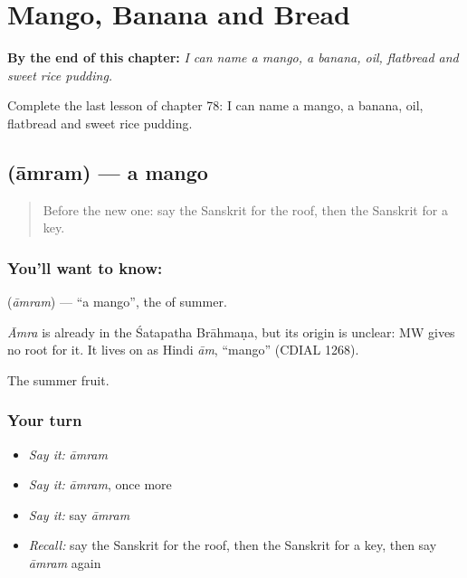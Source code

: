 
\chapter{Mango, Banana and Bread}
\label{ch:sa-mango-banana-bread}

\begin{chapteropening}
\textbf{By the end of this chapter:} \emph{I can name a mango, a banana, oil, flatbread and sweet rice pudding.}

Complete the last lesson of chapter 78: I can name a mango, a banana, oil, flatbread and sweet rice pudding.
\end{chapteropening}

\section[\texorpdfstring{\sk{आम्रम्} (āmram)}{आम्रम् (āmram)}]{ (āmram) — a mango}

\label{lesson:SA-C78-mango}



\begin{quote}
Before the new one: say the Sanskrit for the roof, then the Sanskrit for a key.
\end{quote}

\subsection*{You'll want to know: }
\textbf{} (\emph{āmram}) — \textquotedblleft{}a mango\textquotedblright{}, the \textbf{} of summer.

\begin{cousinweb}
\emph{Āmra} is already in the Śatapatha Brāhmaṇa, but its origin is unclear: MW gives no root for it. It lives on as Hindi \emph{ām}, \textquotedblleft{}mango\textquotedblright{} (CDIAL 1268).
\end{cousinweb}

\begin{grammarlens}[title={What you've built}]
The summer fruit.
\end{grammarlens}

\subsection*{Your turn}
\begin{itemize}
\raggedright
  \item \emph{Say it:} \emph{āmram}
  \item \emph{Say it:} \emph{āmram}, once more
  \item \emph{Say it:} say \emph{āmram}
  \item \emph{Recall:} say the Sanskrit for the roof, then the Sanskrit for a key, then say \emph{āmram} again
\end{itemize}


